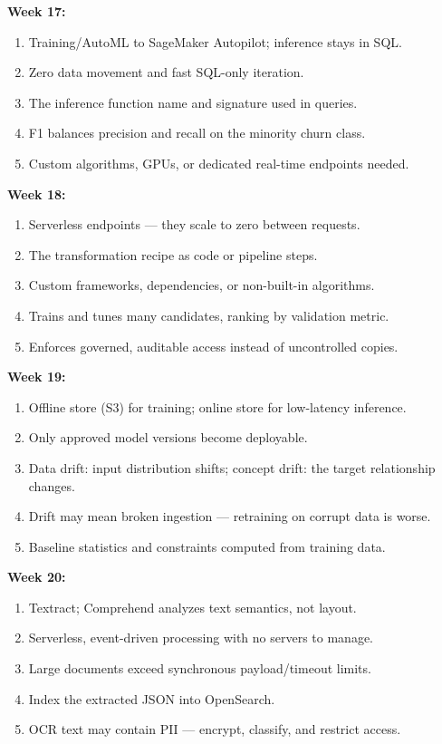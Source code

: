 \documentclass[11pt, a4paper]{article}
\begin{document}
\noindent\textbf{Week 17:}
\begin{enumerate}[itemsep=0pt, leftmargin=2em]
    \item Training/AutoML to SageMaker Autopilot; inference stays in SQL.
    \item Zero data movement and fast SQL-only iteration.
    \item The inference function name and signature used in queries.
    \item F1 balances precision and recall on the minority churn class.
    \item Custom algorithms, GPUs, or dedicated real-time endpoints needed.
\end{enumerate}
\noindent\textbf{Week 18:}
\begin{enumerate}[itemsep=0pt, leftmargin=2em]
    \item Serverless endpoints --- they scale to zero between requests.
    \item The transformation recipe as code or pipeline steps.
    \item Custom frameworks, dependencies, or non-built-in algorithms.
    \item Trains and tunes many candidates, ranking by validation metric.
    \item Enforces governed, auditable access instead of uncontrolled copies.
\end{enumerate}
\noindent\textbf{Week 19:}
\begin{enumerate}[itemsep=0pt, leftmargin=2em]
    \item Offline store (S3) for training; online store for low-latency inference.
    \item Only approved model versions become deployable.
    \item Data drift: input distribution shifts; concept drift: the target relationship changes.
    \item Drift may mean broken ingestion --- retraining on corrupt data is worse.
    \item Baseline statistics and constraints computed from training data.
\end{enumerate}
\noindent\textbf{Week 20:}
\begin{enumerate}[itemsep=0pt, leftmargin=2em]
    \item Textract; Comprehend analyzes text semantics, not layout.
    \item Serverless, event-driven processing with no servers to manage.
    \item Large documents exceed synchronous payload/timeout limits.
    \item Index the extracted JSON into OpenSearch.
    \item OCR text may contain PII --- encrypt, classify, and restrict access.
\end{enumerate}
\end{document}
